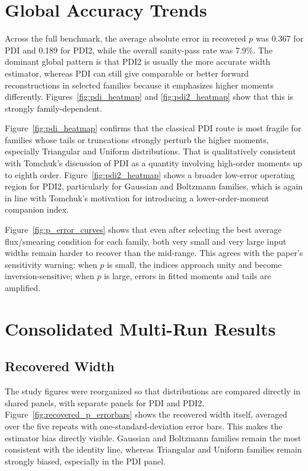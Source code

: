 \documentclass[11pt]{article}
\begin{document}
\section{Global Accuracy Trends}
Across the full benchmark, the average absolute error in recovered $p$ was 0.367 for PDI and 0.189 for PDI2, while the overall sanity-pass rate was 7.9\%.
The dominant global pattern is that PDI2 is usually the more accurate width estimator, whereas PDI can still give comparable or better forward reconstructions in selected families because it emphasizes higher moments differently.
Figures~\ref{fig:pdi_heatmap} and \ref{fig:pdi2_heatmap} show that this is strongly family-dependent.

Figure~\ref{fig:pdi_heatmap} confirms that the classical PDI route is most fragile for families whose tails or truncations strongly perturb the higher moments, especially Triangular and Uniform distributions.
That is qualitatively consistent with Tomchuk's discussion of PDI as a quantity involving high-order moments up to eighth order.
Figure~\ref{fig:pdi2_heatmap} shows a broader low-error operating region for PDI2, particularly for Gaussian and Boltzmann families, which is again in line with Tomchuk's motivation for introducing a lower-order-moment companion index.

Figure~\ref{fig:p_error_curves} shows that even after selecting the best average flux/smearing condition for each family, both very small and very large input widths remain harder to recover than the mid-range.
This agrees with the paper's sensitivity warning: when $p$ is small, the indices approach unity and become inversion-sensitive; when $p$ is large, errors in fitted moments and tails are amplified.

\section{Consolidated Multi-Run Results}
\subsection{Recovered Width}
The study figures were reorganized so that distributions are compared directly in shared panels, with separate panels for PDI and PDI2.
Figure~\ref{fig:recovered_p_errorbars} shows the recovered width itself, averaged over the five repeats with one-standard-deviation error bars.
This makes the estimator bias directly visible.
Gaussian and Boltzmann families remain the most consistent with the identity line, whereas Triangular and Uniform families remain strongly biased, especially in the PDI panel.
\end{document}
